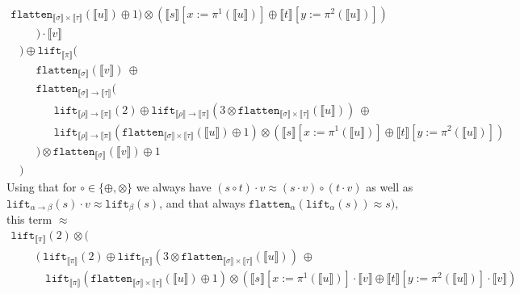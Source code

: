 \documentclass[a4paper,UKenglish,cleveref,autoref,numberwithinsect]{lipics-v2019}
\theoremstyle{definition}
\newcommand{\arrtype}{\rightarrow}
\newcommand{\flatten}{\mathtt{flatten}}
\newcommand{\lift}{\mathtt{lift}}
\newcommand{\typeinterpret}[1]{\llbracket #1 \rrbracket}
\newcommand{\interpret}[1]{\llbracket #1 \rrbracket}
\begin{document}
\begin{itemize}
\[\begin{array}{l}
      \flatten_{\typeinterpret{\sigma} \times \typeinterpret{\tau}}(
      \interpret{u}) \oplus 1) \otimes
      (\interpret{s}[x:=\pi^1(\interpret{u})] \oplus
       \interpret{t}[y:=\pi^2(\interpret{u})]) \\
    \phantom{ABC}
    ) \cdot \interpret{v} \\
    \phantom{A} ) \oplus \lift_{\typeinterpret{\pi}}(\\
    \phantom{ABC}\flatten_{\typeinterpret{\sigma}}(\interpret{v})\
      \oplus \\
    \phantom{ABC}\flatten_{\typeinterpret{\sigma} \arrtype
      \typeinterpret{\tau}}( \\
      \phantom{ABCDE}
       \lift_{\typeinterpret{\rho} \arrtype \typeinterpret{\pi}}(2)
       \oplus \lift_{\typeinterpret{\rho} \arrtype
       \typeinterpret{\pi}}(3 \otimes \flatten_{\typeinterpret{\sigma}
       \times \typeinterpret{\tau}}(\interpret{u}))\ \oplus \\
    \phantom{ABCDE}
      \lift_{\typeinterpret{\rho} \arrtype \typeinterpret{\pi}}(
      \flatten_{\typeinterpret{\sigma} \times \typeinterpret{\tau}}(
      \interpret{u}) \oplus 1) \otimes
      (\interpret{s}[x:=\pi^1(\interpret{u})] \oplus
       \interpret{t}[y:=\pi^2(\interpret{u})]) \\
    \phantom{ABC} ) \otimes
    \flatten_{\typeinterpret{\sigma}}(\interpret{v}) \oplus 1 \\
    \phantom{A} )
  \end{array}
  \]
  Using that for $\circ \in \{\oplus,\otimes\}$ we always have
  $(s \circ t) \cdot v \approx (s \cdot v) \circ (t \cdot v)$ as well
  as $\lift_{\alpha\arrtype \beta}(s) \cdot v \approx \lift_\beta(s)$,
  and that always $\flatten_\alpha(\lift_\alpha(s)) \approx s)$, this
  term $\approx$
  \[
  \begin{array}{l}
  \lift_{\typeinterpret{\pi}}(2) \otimes (\\
    \phantom{ABC}
    (\ \lift_{\typeinterpret{\pi}}(2) \oplus
       \lift_{\typeinterpret{\pi}}(3 \otimes
          \flatten_{\typeinterpret{\sigma} \times
          \typeinterpret{\tau}}(\interpret{u}))\ \oplus \\
    \phantom{ABCD}
      \lift_{\typeinterpret{\pi}}(
      \flatten_{\typeinterpret{\sigma} \times \typeinterpret{\tau}}(
      \interpret{u}) \oplus 1) \otimes
      (\interpret{s}[x:=\pi^1(\interpret{u})] \cdot \interpret{v} \oplus
       \interpret{t}[y:=\pi^2(\interpret{u})] \cdot \interpret{v}) \\
    \phantom{ABC}

\end{array}\]
\end{itemize}
\end{document}
